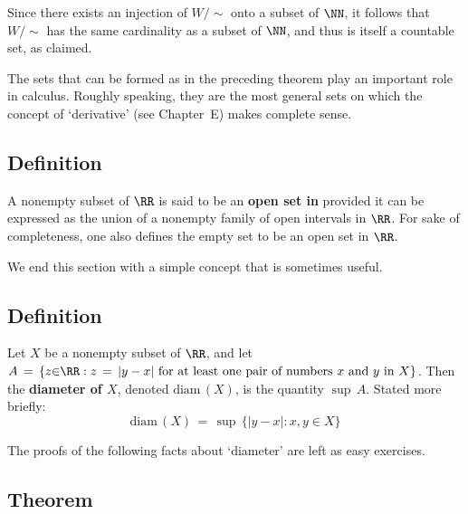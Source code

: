 {        Since there exists an injection of $W/{\sim}$ onto a subset of ${\NN}$, it follows that $W/{\sim}$ has the same cardinality as a subset of ${\NN}$,
    and thus is itself a countable set, as claimed.

\V

        The sets that can be formed as in the preceding theorem play an important role in calculus.
    Roughly speaking, they are the most general sets on which the concept of `derivative' (see Chapter~E) makes complete sense.

\V

            \subsection{\small{\bf Definition}}
            \label{DefB30.185}

        A nonempty subset of ${\RR}$ is said to be an {\bf open set in {\RR}} provided it can be expressed as the union of a nonempty family of open intervals in ${\RR}$.
    For sake of completeness, one also defines the empty set to be an open set in ${\RR}$.

\V
\V

        We end this section with a simple concept that is sometimes useful.

\V

            \subsection{\small{\bf Definition}}
            \label{DefB30.190}

\V

        Let $X$ be a nonempty subset of ${\RR}$, and let $A \,=\, \{z{\in}{\RR}: z \,=\, |y-x| \mbox{ for at least one pair of numbers $x$ and $y$ in $X$}\}$.
    Then the {\bf diameter of $X$}, denoted $\mbox{diam}\,(X)$, is the quantity ${\sup}\,A$.
    Stated more briefly:
        \begin{equation}
        \label{EqnB.100}
        \mbox{diam}\,(X) \,=\, {\sup}\,\{|y-x|: x,y{\in}X\}
        \end{equation}

\V
\V

        The proofs of the following facts about `diameter' are left as easy exercises.

\V

            \subsection{\small{\bf Theorem}}
            \label{ThmB30.200}

}
